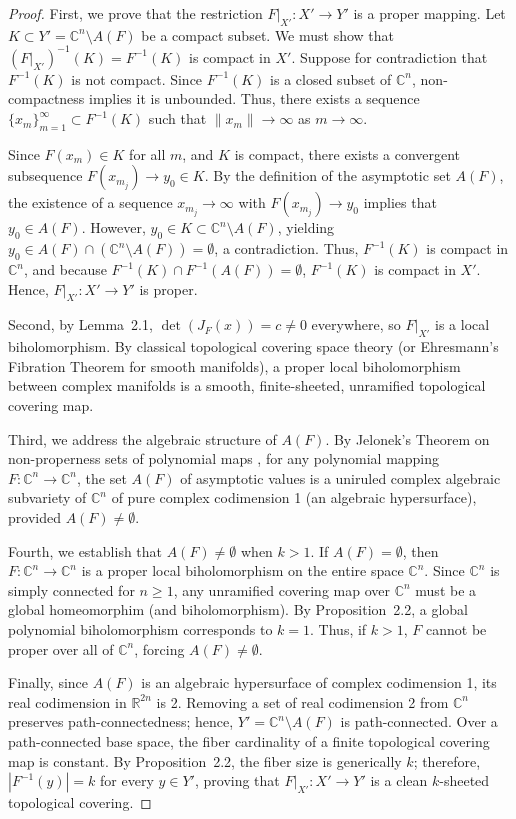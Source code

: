 \documentclass[11pt,reqno]{amsart}
\theoremstyle{definition}
\begin{document}
\begin{proof}
First, we prove that the restriction $F\big|_{X'}: X' \to Y'$ is a proper mapping. Let $K \subset Y' = \mathbb{C}^n \setminus A(F)$ be a compact subset. We must show that $(F\big|_{X'})^{-1}(K) = F^{-1}(K)$ is compact in $X'$. Suppose for contradiction that $F^{-1}(K)$ is not compact. Since $F^{-1}(K)$ is a closed subset of $\mathbb{C}^n$, non-compactness implies it is unbounded. Thus, there exists a sequence $\{x_m\}_{m=1}^\infty \subset F^{-1}(K)$ such that $\|x_m\| \to \infty$ as $m \to \infty$.

Since $F(x_m) \in K$ for all $m$, and $K$ is compact, there exists a convergent subsequence $F(x_{m_j}) \to y_0 \in K$. By the definition of the asymptotic set $A(F)$, the existence of a sequence $x_{m_j} \to \infty$ with $F(x_{m_j}) \to y_0$ implies that $y_0 \in A(F)$. However, $y_0 \in K \subset \mathbb{C}^n \setminus A(F)$, yielding $y_0 \in A(F) \cap (\mathbb{C}^n \setminus A(F)) = \emptyset$, a contradiction. Thus, $F^{-1}(K)$ is compact in $\mathbb{C}^n$, and because $F^{-1}(K) \cap F^{-1}(A(F)) = \emptyset$, $F^{-1}(K)$ is compact in $X'$. Hence, $F\big|_{X'}: X' \to Y'$ is proper.

Second, by Lemma~2.1, $\det(J_F(x)) = c \neq 0$ everywhere, so $F\big|_{X'}$ is a local biholomorphism. By classical topological covering space theory (or Ehresmann's Fibration Theorem for smooth manifolds), a proper local biholomorphism between complex manifolds is a smooth, finite-sheeted, unramified topological covering map.

Third, we address the algebraic structure of $A(F)$. By Jelonek's Theorem on non-properness sets of polynomial maps \cite{Jelonek1993, Jelonek2002}, for any polynomial mapping $F: \mathbb{C}^n \to \mathbb{C}^n$, the set $A(F)$ of asymptotic values is a uniruled complex algebraic subvariety of $\mathbb{C}^n$ of pure complex codimension 1 (an algebraic hypersurface), provided $A(F) \neq \emptyset$.

Fourth, we establish that $A(F) \neq \emptyset$ when $k > 1$. If $A(F) = \emptyset$, then $F: \mathbb{C}^n \to \mathbb{C}^n$ is a proper local biholomorphism on the entire space $\mathbb{C}^n$. Since $\mathbb{C}^n$ is simply connected for $n \ge 1$, any unramified covering map over $\mathbb{C}^n$ must be a global homeomorphim (and biholomorphism). By Proposition~2.2, a global polynomial biholomorphism corresponds to $k = 1$. Thus, if $k > 1$, $F$ cannot be proper over all of $\mathbb{C}^n$, forcing $A(F) \neq \emptyset$.

Finally, since $A(F)$ is an algebraic hypersurface of complex codimension 1, its real codimension in $\mathbb{R}^{2n}$ is 2. Removing a set of real codimension 2 from $\mathbb{C}^n$ preserves path-connectedness; hence, $Y' = \mathbb{C}^n \setminus A(F)$ is path-connected. Over a path-connected base space, the fiber cardinality of a finite topological covering map is constant. By Proposition~2.2, the fiber size is generically $k$; therefore, $|F^{-1}(y)| = k$ for every $y \in Y'$, proving that $F\big|_{X'}: X' \to Y'$ is a clean $k$-sheeted topological covering.
\end{proof}
\end{document}
